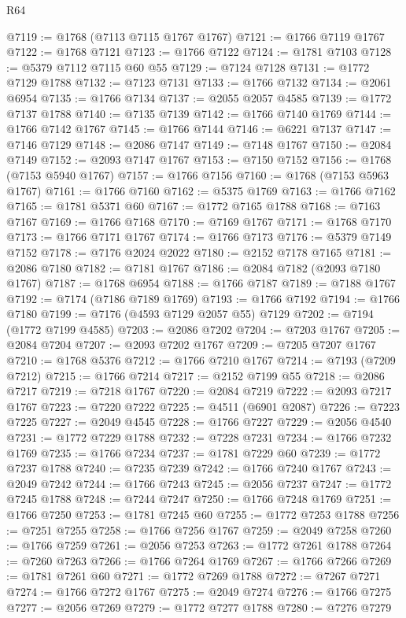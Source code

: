 \begin{lexlean}{R64}
\begin{coremodule}
@7119 := @1768 (@7113 @7115 @1767 @1767)
@7121 := @1766 @7119 @1767
@7122 := @1768 @7121
@7123 := @1766 @7122
@7124 := @1781 @7103
@7128 := @5379 @7112 @7115 @60 @55
@7129 := @7124 @7128
@7131 := @1772 @7129 @1788
@7132 := @7123 @7131
@7133 := @1766 @7132
@7134 := @2061 @6954
@7135 := @1766 @7134
@7137 := @2055 @2057 @4585
@7139 := @1772 @7137 @1788
@7140 := @7135 @7139
@7142 := @1766 @7140 @1769
@7144 := @1766 @7142 @1767
@7145 := @1766 @7144
@7146 := @6221 @7137
@7147 := @7146 @7129
@7148 := @2086 @7147
@7149 := @7148 @1767
@7150 := @2084 @7149
@7152 := @2093 @7147 @1767
@7153 := @7150 @7152
@7156 := @1768 (@7153 @5940 @1767)
@7157 := @1766 @7156
@7160 := @1768 (@7153 @5963 @1767)
@7161 := @1766 @7160
@7162 := @5375 @1769
@7163 := @1766 @7162
@7165 := @1781 @5371 @60
@7167 := @1772 @7165 @1788
@7168 := @7163 @7167
@7169 := @1766 @7168
@7170 := @7169 @1767
@7171 := @1768 @7170
@7173 := @1766 @7171 @1767
@7174 := @1766 @7173
@7176 := @5379 @7149 @7152
@7178 := @7176 @2024 @2022
@7180 := @2152 @7178 @7165
@7181 := @2086 @7180
@7182 := @7181 @1767
@7186 := @2084 @7182 (@2093 @7180 @1767)
@7187 := @1768 @6954
@7188 := @1766 @7187
@7189 := @7188 @1767
@7192 := @7174 (@7186 @7189 @1769)
@7193 := @1766 @7192
@7194 := @1766 @7180
@7199 := @7176 (@4593 @7129 @2057 @55) @7129
@7202 := @7194 (@1772 @7199 @4585)
@7203 := @2086 @7202
@7204 := @7203 @1767
@7205 := @2084 @7204
@7207 := @2093 @7202 @1767
@7209 := @7205 @7207 @1767
@7210 := @1768 @5376
@7212 := @1766 @7210 @1767
@7214 := @7193 (@7209 @7212)
@7215 := @1766 @7214
@7217 := @2152 @7199 @55
@7218 := @2086 @7217
@7219 := @7218 @1767
@7220 := @2084 @7219
@7222 := @2093 @7217 @1767
@7223 := @7220 @7222
@7225 := @4511 (@6901 @2087)
@7226 := @7223 @7225
@7227 := @2049 @4545
@7228 := @1766 @7227
@7229 := @2056 @4540
@7231 := @1772 @7229 @1788
@7232 := @7228 @7231
@7234 := @1766 @7232 @1769
@7235 := @1766 @7234
@7237 := @1781 @7229 @60
@7239 := @1772 @7237 @1788
@7240 := @7235 @7239
@7242 := @1766 @7240 @1767
@7243 := @2049 @7242
@7244 := @1766 @7243
@7245 := @2056 @7237
@7247 := @1772 @7245 @1788
@7248 := @7244 @7247
@7250 := @1766 @7248 @1769
@7251 := @1766 @7250
@7253 := @1781 @7245 @60
@7255 := @1772 @7253 @1788
@7256 := @7251 @7255
@7258 := @1766 @7256 @1767
@7259 := @2049 @7258
@7260 := @1766 @7259
@7261 := @2056 @7253
@7263 := @1772 @7261 @1788
@7264 := @7260 @7263
@7266 := @1766 @7264 @1769
@7267 := @1766 @7266
@7269 := @1781 @7261 @60
@7271 := @1772 @7269 @1788
@7272 := @7267 @7271
@7274 := @1766 @7272 @1767
@7275 := @2049 @7274
@7276 := @1766 @7275
@7277 := @2056 @7269
@7279 := @1772 @7277 @1788
@7280 := @7276 @7279

\end{coremodule}
\end{lexlean}
